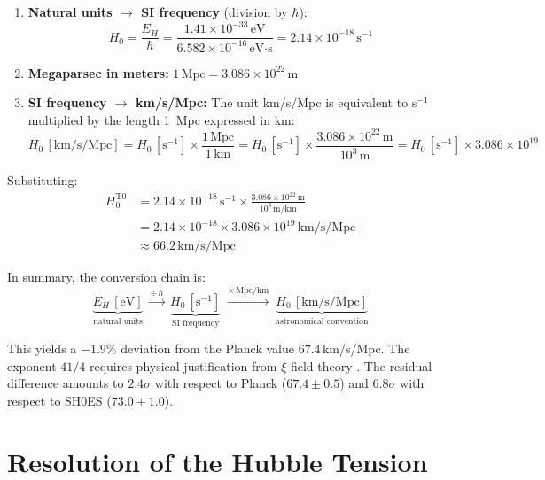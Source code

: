 	\begin{enumerate}
		\item \textbf{Natural units $\rightarrow$ SI frequency} (division by $\hbar$):
		\begin{equation*}
			H_0 = \frac{E_H}{\hbar} = \frac{1.41 \times 10^{-33}\,\text{eV}}{6.582 \times 10^{-16}\,\text{eV·s}} = 2.14 \times 10^{-18}\,\text{s}^{-1}
		\end{equation*}
		\item \textbf{Megaparsec in meters:} $1\,\text{Mpc} = 3.086 \times 10^{22}\,\text{m}$
		\item \textbf{SI frequency $\rightarrow$ km/s/Mpc:} The unit km/s/Mpc is equivalent to $\text{s}^{-1}$ multiplied by the length 1~Mpc expressed in km:
		\begin{equation*}
			H_0\,[\text{km/s/Mpc}] = H_0\,[\text{s}^{-1}] \times \frac{1\,\text{Mpc}}{1\,\text{km}} = H_0\,[\text{s}^{-1}] \times \frac{3.086 \times 10^{22}\,\text{m}}{10^{3}\,\text{m}} = H_0\,[\text{s}^{-1}] \times 3.086 \times 10^{19}
		\end{equation*}
	\end{enumerate}
	
	Substituting:
	\begin{align*}
		H_0^{\text{T0}} &= 2.14 \times 10^{-18}\,\text{s}^{-1} \times \frac{3.086 \times 10^{22}\,\text{m}}{10^3\,\text{m/km}} \\
		&= 2.14 \times 10^{-18} \times 3.086 \times 10^{19}\,\text{km/s/Mpc} \\
		&\approx 66.2\,\text{km/s/Mpc}
	\end{align*}
	
	In summary, the conversion chain is:
	\begin{equation}
		\underbrace{E_H\,[\text{eV}]}_{\text{natural units}} \;\xrightarrow{\div\,\hbar}\; \underbrace{H_0\,[\text{s}^{-1}]}_{\text{SI frequency}} \;\xrightarrow{\times\,\text{Mpc}/\text{km}}\; \underbrace{H_0\,[\text{km/s/Mpc}]}_{\text{astronomical convention}}
	\end{equation}
	
	This yields a $-1.9\%$ deviation from the Planck value $67.4\,$km/s/Mpc. The exponent $41/4$ requires physical justification from $\xi$-field theory \cite{riess2019}. The residual difference amounts to $2.4\sigma$ with respect to Planck ($67.4 \pm 0.5$) and $6.8\sigma$ with respect to SH0ES ($73.0 \pm 1.0$).
	
	\section{Resolution of the Hubble Tension}
	
